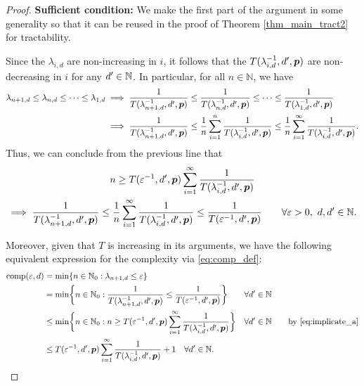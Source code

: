 \documentclass[11pt,a4paper]{article}
\begin{document}
\begin{proof}
\textbf{Sufficient condition:}\newline
We make the first part of the argument in some generality so that it can be reused in the proof of Theorem \ref{thm_main_tract2} for tractability.

Since the $\lambda_{i,d}$ are non-increasing in $i$, it follows that the $T(\lambda_{i,d}^{-1},d',\boldsymbol{p})$ are non-decreasing in $i$ for any $d'\in\mathbb{N}$. In particular, for all $n\in \mathbb{N}$, we have
\begin{align*}
    \lambda_{n+1,d} \le \lambda_{n,d} \le \cdots \le \lambda_{1,d}
    & \implies \frac{1}{T(\lambda_{n+1, d}^{-1},d',\boldsymbol{p})} \le \frac{1}{T(\lambda_{n, d}^{-1},d',\boldsymbol{p})} \le \cdots \le \frac{1}{T(\lambda_{1, d}^{-1},d',\boldsymbol{p})} \\
    & \implies \frac{1}{T(\lambda_{n+1, d}^{-1},d',\boldsymbol{p}) }
    \le \frac 1n \sum_{i=1}^n  \frac{1}{T(\lambda_{i, d}^{-1},d',\boldsymbol{p}) }
    \le \frac 1n \sum_{i=1}^\infty  \frac{1}{T(\lambda_{i, d}^{-1},d',\boldsymbol{p})}.
\end{align*}
Thus, we can conclude from the previous line that
\begin{multline} \label{eq:implicate_a}
    n \ge T(\varepsilon^{-1},d',\boldsymbol{p}) \sum_{i=1}^\infty \frac{1}{T(\lambda_{i, d}^{-1},d',\boldsymbol{p})} \\
   \implies   \frac{1}{T(\lambda_{n+1, d}^{-1},d',\boldsymbol{p})} \le
   \frac 1n \sum_{i=1}^\infty \frac{1}{T(\lambda_{i, d}^{-1},d',\boldsymbol{p}) } \le \frac{1}{T(\varepsilon^{-1},d',\boldsymbol{p})} \qquad \forall \varepsilon > 0, \ d,d' \in \mathbb{N}.
\end{multline}



Moreover, given that $T$ is increasing in its arguments, we have the following equivalent expression for the complexity via \eqref{eq:comp_def}:
    \begin{align} %
    \nonumber
    \comp(\varepsilon, d) & = \min \{n \in \natzero : \lambda_{n+1, d} \le \varepsilon\} \\
    \nonumber
    & = \min \biggl\{n \in \natzero : \frac{1}{T(\lambda_{n+1,d}^{-1},d',\vp)}\le \frac{1}{T(\varepsilon^{-1},d',\vp) }\biggr\} \qquad \forall d' \in \naturals\\
    \nonumber
    & \le  \min \biggl\{n \in \natzero : n \ge T(\varepsilon^{-1},d',\vp) \sum_{i=1}^\infty \frac{1}{T(\lambda_{i, d}^{-1},d',\vp)} \biggr\} \quad \forall d' \in \naturals \qquad \text{by \eqref{eq:implicate_a}} \\
    & \le  T(\varepsilon^{-1},d',\vp) \sum_{i=1}^\infty \frac{1}{T(\lambda_{i, d}^{-1},d',\vp)} + 1 \quad \forall d' \in \naturals. \label{eq:compUP}
\end{align}


\end{proof}
\end{document}
